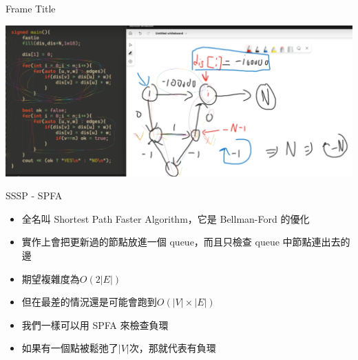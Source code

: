 \documentclass[aspectratio=169]{beamer}
\begin{document}
    \begin{frame}{Frame Title}
        \begin{center}
             \includegraphics[scale=0.3]{images/image.png}
        \end{center}
    \end{frame}
    
    \begin{frame}{SSSP - SPFA}
        \begin{itemize}
            \item 全名叫 Shortest Path Faster Algorithm，它是 Bellman-Ford 的優化
            \item<2-> 實作上會把更新過的節點放進一個 queue，而且只檢查 queue 中節點連出去的邊
            \item<3-> 期望複雜度為$O(2|E|)$
            \item<4-> 但在最差的情況還是可能會跑到$O(|V|\times |E|)$
            \item<5-> 我們一樣可以用 SPFA 來檢查負環
            \item<5-> 如果有一個點被鬆弛了$|V|$次，那就代表有負環
        \end{itemize}
    \end{frame}
    
\end{document}
